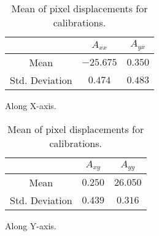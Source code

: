 \begin{table}[h]
	\centering
    \begin{subtable}{\textwidth}
        \centering
        \footnotesize
        \begin{tabular}{ccc}
            \toprule
                & $A_{xx}$ & $A_{yx}$  \\
            \midrule
            Mean & $-25.675$ & $0.350$  \\
            Std. Deviation & $0.474$ & $0.483$  \\
            \bottomrule
        \end{tabular}
        \label{subtable:average_shift_axx_ayx}
        \caption{Along X-axis.}
    \end{subtable}

   \vspace{10pt} 

    \begin{subtable}{\textwidth}
        \centering
        \footnotesize
        \begin{tabular}{ccc}
            \toprule
                & $A_{xy}$ & $A_{yy}$  \\
            \midrule
            Mean & $0.250$ & $26.050$  \\
            Std. Deviation & $0.439$ & $0.316$  \\
            \bottomrule
        \end{tabular}
        \label{subtable:average_shift_axy_ayy}
        \caption{Along Y-axis.}
    \end{subtable}
    \caption{Mean of pixel displacements for calibrations.}
	\label{table:mean_pixel_displacements}
\end{table}

